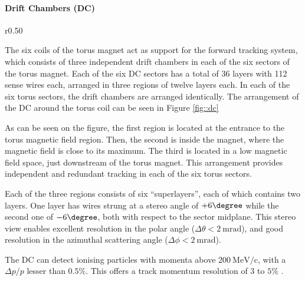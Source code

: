 \paragraph{Drift Chambers (DC)}
    \begin{wrapfigure}{r}{0.50\textwidth}
        \centering{}
        \caption[DC]{Drift Chambers render.
        Each of the DC regions are denoted as R1, R2, and R3 in the figure.}
        \label{fig::dc}
    \end{wrapfigure}

    The six coils of the torus magnet act as support for the forward tracking system, which consists of three independent drift chambers in each of the six sectors of the torus magnet.
    Each of the six DC sectors has a total of 36 layers with 112 sense wires each, arranged in three regions of twelve layers each.
    In each of the six torus sectors, the drift chambers are arranged identically.
    The arrangement of the DC around the torus coil can be seen in Figure \ref{fig::dc}

    As can be seen on the figure, the first region is located at the entrance to the torus magnetic field region.
    Then, the second is inside the magnet, where the magnetic field is close to its maximum.
    The third is located in a low magnetic field space, just downstream of the torus magnet.
    This arrangement provides independent and redundant tracking in each of the six torus sectors.

    Each of the three regions consists of six ``superlayers'', each of which contains two layers.
    One layer has wires strung at a stereo angle of $+6\degree$ while the second one of $-6\degree$, both with respect to the sector midplane.
    This stereo view enables excellent resolution in the polar angle ($\Delta\theta < 2 ~\text{mrad}$), and good resolution in the azimuthal scattering angle ($\Delta\phi < 2 ~\text{mrad}$).

    The DC can detect ionising particles with momenta above $200 ~\text{MeV}/\text{c}$, with a $\Delta p/p$ lesser than $0.5\%$.
    This offers a track momentum resolution of $3$ to $5\%$ \cite{mestayer2020}.
